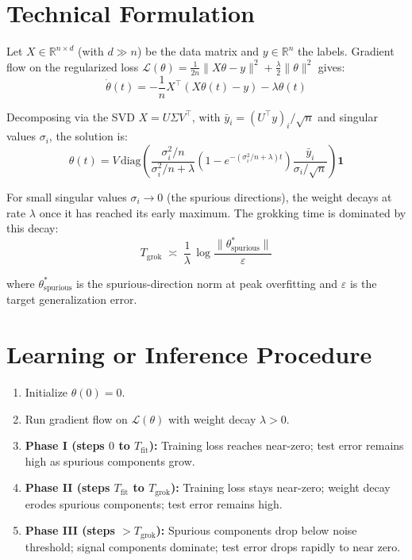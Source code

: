 \documentclass[10pt,twocolumn]{article}
\begin{document}
\section{Technical Formulation}

Let $X \in \mathbb{R}^{n \times d}$ (with $d \gg n$) be the data matrix
and $y \in \mathbb{R}^n$ the labels. Gradient flow on the regularized
loss $\mathcal{L}(\theta) = \tfrac{1}{2n}\|X\theta - y\|^2 +
\tfrac{\lambda}{2}\|\theta\|^2$ gives:
\[
\dot{\theta}(t) = -\frac{1}{n}X^\top(X\theta(t) - y) - \lambda\theta(t)
\]

Decomposing via the SVD $X = U\Sigma V^\top$, with
$\bar{y}_i = (U^\top y)_i / \sqrt{n}$ and singular values $\sigma_i$,
the solution is:
\[
\theta(t) = V\,\text{diag}\!\left(
  \frac{\sigma_i^2/n}{\sigma_i^2/n + \lambda}
  \!\left(1 - e^{-(\sigma_i^2/n + \lambda)t}\right)
  \frac{\bar{y}_i}{\sigma_i/\sqrt{n}}
\right)\!\mathbf{1}
\]

For small singular values $\sigma_i \to 0$ (the spurious directions),
the weight decays at rate $\lambda$ once it has reached its early
maximum. The grokking time is dominated by this decay:
\[
T_{\text{grok}} \;\asymp\;
\frac{1}{\lambda}\,\log\!\frac{\|\theta^*_{\text{spurious}}\|}{\varepsilon}
\]

where $\theta^*_{\text{spurious}}$ is the spurious-direction norm at
peak overfitting and $\varepsilon$ is the target generalization error.

\section{Learning or Inference Procedure}

\begin{enumerate}[itemsep=2pt,parsep=0pt]
  \item Initialize $\theta(0) = 0$.
  \item Run gradient flow on $\mathcal{L}(\theta)$ with weight decay $\lambda > 0$.
  \item \textbf{Phase I (steps $0$ to $T_{\text{fit}}$):} Training loss
    reaches near-zero; test error remains high as spurious components grow.
  \item \textbf{Phase II (steps $T_{\text{fit}}$ to $T_{\text{grok}}$):}
    Training loss stays near-zero; weight decay erodes spurious components;
    test error remains high.
  \item \textbf{Phase III (steps $> T_{\text{grok}}$):} Spurious components
    drop below noise threshold; signal components dominate; test error
    drops rapidly to near zero.
\end{enumerate}
\end{document}
